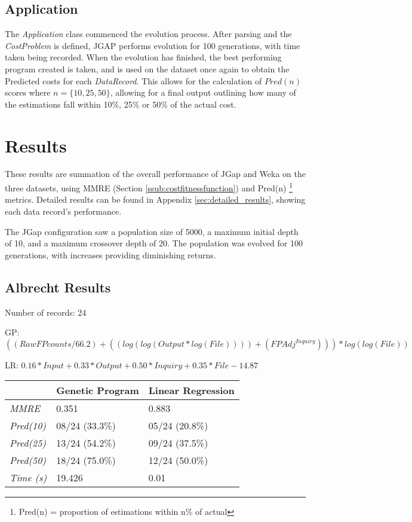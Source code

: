 \documentclass[11pt, a4paper]{article}
\begin{document}
\subsection{Application} %
\label{sub:application}
The \emph{Application} class commenced the evolution process. After parsing and
the \emph{CostProblem} is defined, JGAP performs evolution for 100 generations,
with time taken being recorded. When the evolution has finished, the best
performing program created is taken, and is used on the dataset once again to
obtain the Predicted costs for each \emph{DataRecord}. This allows for the
calculation of \(Pred(n)\) scores where \(n = \{10, 25, 50\}\), allowing for a
final output outlining how many of the estimations fall within 10\%, 25\% or
50\% of the actual cost.
\newpage
\section{Results} %
\label{sec:results}
These results are summation of the overall performance of JGap and Weka on the
three datasets, using MMRE (Section \ref{ssub:costfitnessfunction}) and
Pred(n) \footnote{Pred(n) = proportion of estimations within n\% of actual}
metrics. Detailed results can be found in Appendix \ref{sec:detailed_results},
showing each data record's performance.

The JGap configuration saw a population size of 5000, a maximum initial depth of
10, and a maximum crossover depth of 20. The population was evolved for 100
generations, with increases providing diminishing returns.

\subsection{Albrecht Results} %
\label{sub:albrecht_results}
Number of records: 24

GP:
\(((RawFPcounts / 66.2) + ((log (log (Output * log (File)))) +
(FPAdj ^ {Inquiry}))) * log (log (File))\)

LR:
\(0.16 * Input + 0.33 * Output + 0.50 * Inquiry + 0.35 * File - 14.87\)

\begin{tabularx}{\textwidth}{| l | X | X |}
\hline
 & \textbf{Genetic Program} & \textbf{Linear Regression} \\
\hline
\emph{MMRE} & 0.351 & 0.883 \\
\hline
\emph{Pred(10)} & 08/24 (33.3\%) & 05/24 (20.8\%) \\
\emph{Pred(25)} & 13/24 (54.2\%) & 09/24 (37.5\%) \\
\emph{Pred(50)} & 18/24 (75.0\%) & 12/24 (50.0\%) \\
\hline
\emph{Time (s)} & 19.426 & 0.01 \\
\hline
\end{tabularx}
\end{document}
